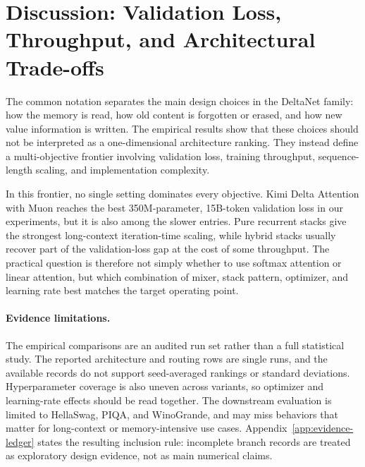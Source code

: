 \documentclass{article}
\begin{document}
\section{Discussion: Validation Loss, Throughput, and Architectural Trade-offs}
\label{sec:discussion}

The common notation separates the main design choices in the DeltaNet family: how the memory is read, how old content is forgotten or erased, and how new value information is written. The empirical results show that these choices should not be interpreted as a one-dimensional architecture ranking. They instead define a multi-objective frontier involving validation loss, training throughput, sequence-length scaling, and implementation complexity.

In this frontier, no single setting dominates every objective. Kimi Delta Attention with Muon reaches the best 350M-parameter, 15B-token validation loss in our experiments, but it is also among the slower entries. Pure recurrent stacks give the strongest long-context iteration-time scaling, while hybrid stacks usually recover part of the validation-loss gap at the cost of some throughput. The practical question is therefore not simply whether to use softmax attention or linear attention, but which combination of mixer, stack pattern, optimizer, and learning rate best matches the target operating point.

\paragraph{Evidence limitations.}
The empirical comparisons are an audited run set rather than a full statistical study. The reported architecture and routing rows are single runs, and the available records do not support seed-averaged rankings or standard deviations. Hyperparameter coverage is also uneven across variants, so optimizer and learning-rate effects should be read together. The downstream evaluation is limited to HellaSwag, PIQA, and WinoGrande, and may miss behaviors that matter for long-context or memory-intensive use cases. Appendix~\ref{app:evidence-ledger} states the resulting inclusion rule: incomplete branch records are treated as exploratory design evidence, not as main numerical claims.
\end{document}
